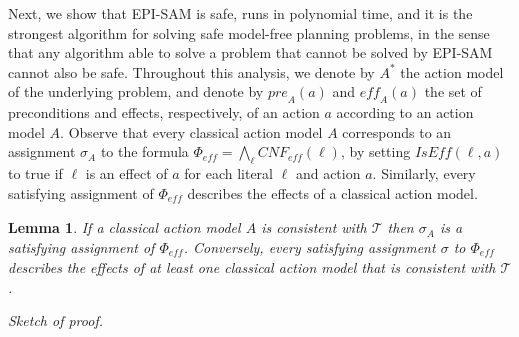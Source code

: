 \documentclass[letterpaper]{article} %
\newcommand{\tuple}[1]{\ensuremath{\left \langle #1 \right \rangle }}
\newcommand{\pre}{\textit{pre}}
\newcommand{\eff}{\textit{eff}}
\newcommand{\cnf}{\textit{CNF}}
\newcommand{\true}{\textit{true}}
\newcommand{\iseff}{\textit{IsEff}}
\newcommand{\ispre}{\textit{IsPre}}
\newcommand{\state}{\textit{State}}
\newtheorem{lemma}{Lemma}
\begin{document}
Next, we show that EPI-SAM is safe, runs in polynomial time, and it is the strongest algorithm for solving safe model-free planning problems, in the sense that any algorithm able to solve a problem that cannot be solved by EPI-SAM cannot also be safe. 
Throughout this analysis, we denote by $A^*$ the action model of the underlying problem, and denote by $\pre_A(a)$ and $\eff_A(a)$ the set of preconditions and effects, respectively, of an action $a$ according to an action model $A$. 
Observe that every classical action model $A$ corresponds to an assignment $\sigma_A$ to the formula $\Phi_\eff=\bigwedge_\ell \cnf_\eff(\ell)$, by setting $\iseff(\ell,a)$ to true if $\ell$ is an effect of $a$ for each literal $\ell$ and action $a$. 
Similarly, every satisfying assignment of $\Phi_\eff$ describes the effects of a classical action model. 
\begin{lemma}\label{lem:cnf-char-appendix}
If a classical action model $A$ is consistent with $\mathcal{T}$
then $\sigma_A$ is a satisfying assignment of $\Phi_\eff$. 
Conversely, every satisfying assignment $\sigma$ to $\Phi_\eff$ describes the effects of at least one classical action model that is consistent with $\mathcal{T}$. 
\end{lemma}
\noindent
{\em Sketch of proof.}
\end{document}
